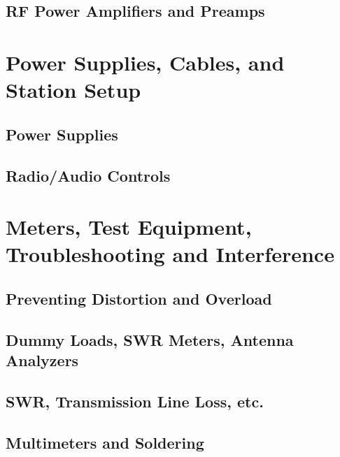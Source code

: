 \documentclass[12pt]{book}
\begin{document}
\section{RF Power Amplifiers and Preamps}

\chapter{Power Supplies, Cables, and Station Setup}
\section{Power Supplies}

\section{Radio/Audio Controls}

\chapter{Meters, Test Equipment, Troubleshooting and Interference}
\section{Preventing Distortion and Overload}



\section{Dummy Loads, SWR Meters, Antenna Analyzers}

\section{SWR, Transmission Line Loss, etc.}


\section{Multimeters and Soldering}




\end{document}
